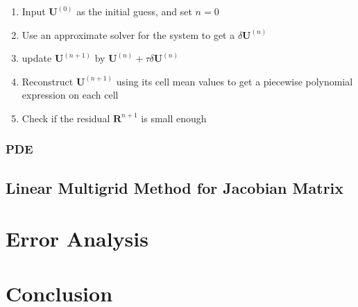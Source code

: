 \documentclass[11pt]{diazessay} %
\begin{document}
\begin{enumerate}
    \item Input $\textbf{U}^{(0)}$ as the initial guess, and set $n=0$
    \item Use an approximate solver for the system to get a $\delta \textbf{U}^{(n)}$
    \item update $\textbf{U}^{(n+1)}$ by $\textbf{U}^{(n)}+\tau\delta \textbf{U}^{(n)}$
    \item Reconstruct $\textbf{U}^{(n+1)}$ using its cell mean values to get a piecewise polynomial expression on each cell
    \item Check if the residual $\textbf{R}^{n+1}$ is small enough
\end{enumerate}

\subsubsection{PDE}

\subsection{Linear Multigrid Method for Jacobian Matrix}
\cite{jameson_solution_1983}

\section{Error Analysis}
\section{Conclusion}





\end{document}
